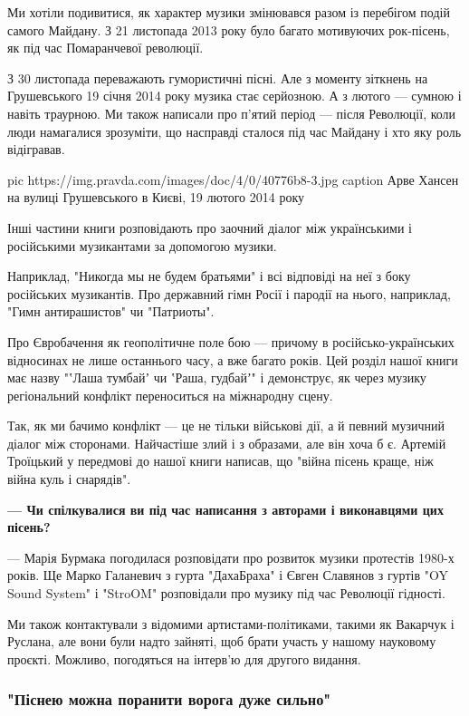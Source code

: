 Ми хотіли подивитися, як характер музики змінювався разом із перебігом подій
самого Майдану. З 21 листопада 2013 року було багато мотивуючих рок-пісень, як
під час Помаранчевої революції. 

З 30 листопада переважають гумористичні пісні. Але з моменту зіткнень на
Грушевського 19 січня 2014 року музика стає серйозною. А з лютого — сумною і
навіть траурною. Ми також написали про п’ятий період — після Революції, коли
люди намагалися зрозуміти, що насправді сталося під час Майдану і хто яку роль
відігравав.

\ifcmt
pic https://img.pravda.com/images/doc/4/0/40776b8-3.jpg
caption Арве Хансен на вулиці Грушевського в Києві, 19 лютого 2014 року 
\fi

Інші частини книги розповідають про заочний діалог між українськими і
російськими музикантами за допомогою музики. 

Наприклад, "Никогда мы не будем братьями" і всі відповіді на неї з боку
російських музикантів. Про державний гімн Росії і пародії на нього, наприклад,
"Гимн антирашистов" чи "Патриоты". 

Про Євробачення як геополітичне поле бою — причому в російсько-українських
відносинах не лише останнього часу, а вже багато років. Цей розділ нашої книги
має назву "ʽЛаша тумбайʼ чи ʽРаша, гудбайʼ" і демонструє, як через музику
регіональний конфлікт переноситься на міжнародну сцену. 

Так, як ми бачимо конфлікт — це не тільки військові дії, а й певний музичний
діалог між сторонами. Найчастіше злий і з образами, але він хоча б є. Артемій
Троїцький у передмові до нашої книги написав, що "війна пісень краще, ніж війна
куль і снарядів". 

\textbf{— Чи спілкувалися ви під час написання з авторами і виконавцями цих
пісень?}

— Марія Бурмака погодилася розповідати про розвиток музики протестів 1980-х
років. Ще Марко Галаневич з гурта "ДахаБраха" і Євген Славянов з гуртів "OY
Sound System" і "StroOM" розповідали про музику під час Революції гідності. 

Ми також контактували з відомими артистами-політиками, такими як Вакарчук і
Руслана, але вони були надто зайняті, щоб брати участь у нашому науковому
проєкті. Можливо, погодяться на інтерв’ю для другого видання.

\subsubsection{"Піснею можна поранити ворога дуже сильно"}

